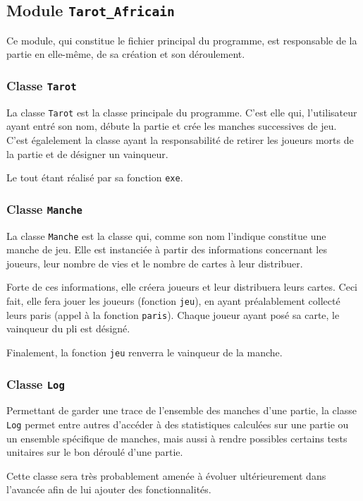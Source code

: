    \subsection{Module \texttt{Tarot\_Africain}}\label{subsec:module-tarot-africain}
      Ce module, qui constitue le fichier principal du programme, est responsable de la partie en elle-même, de sa création et son déroulement.
      \subsubsection{Classe \texttt{Tarot}}
         La classe \texttt{Tarot} est la classe principale du programme.
         C'est elle qui, l'utilisateur ayant entré son nom, débute la partie et crée les manches successives de jeu.
         C'est égalelement la classe ayant la responsabilité de retirer les joueurs morts de la partie et de désigner un vainqueur.

         Le tout étant réalisé par sa fonction \texttt{exe}.
      \subsubsection{Classe \texttt{Manche}}
         La classe \texttt{Manche} est la classe qui, comme son nom l'indique constitue une manche de jeu.
         Elle est instanciée à partir des informations concernant les joueurs, leur nombre de vies et le nombre de cartes à leur distribuer.

         Forte de ces informations, elle créera joueurs et leur distribuera leurs cartes.
         Ceci fait, elle fera jouer les joueurs (fonction \texttt{jeu}), en ayant préalablement collecté leurs paris (appel à la fonction \texttt{paris}).
         Chaque joueur ayant posé sa carte, le vainqueur du pli est désigné.

         Finalement, la fonction \texttt{jeu} renverra le vainqueur de la manche.
      \subsubsection{Classe \texttt{Log}}
         Permettant de garder une trace de l'ensemble des manches d'une partie, la classe \texttt{Log} permet entre autres d'accéder à des statistiques calculées sur une partie ou un ensemble spécifique de manches, mais aussi à rendre possibles certains tests unitaires sur le bon déroulé d'une partie.

         Cette classe sera très probablement amenée à évoluer ultérieurement dans l'avancée afin de lui ajouter des fonctionnalités.

